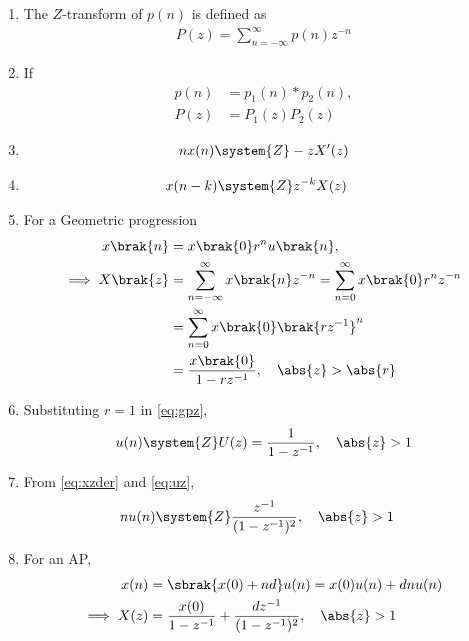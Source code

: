 \begin{enumerate}[label=\thechapter.\arabic*,ref=\thechapter.\theenumi]
\item 
	The $Z$-transform of $p(n)$ is defined as
\begin{align}
P(z) = \sum_{n=-\infty}^{\infty}p(n)z^{-n}
\label{eq:ztrans}
\end{align}
\item If 
\begin{align}
	p(n) &= p_1(n)* p_2(n),
	\\
	P(z)&=P_1(z)P_2(z)
\label{eq:prodz}
\end{align}
\item 
\begin{align}
	nx(n) \system{Z} -zX^{\prime}(z)
\label{eq:xzder}
\end{align}
\item 
\begin{align}
	x(n-k) &\system{Z} z^{-k}X(z)
\label{eq:shiftk}
\end{align}
\item For a Geometric progression 
\begin{align}
	       \label{eq:gpn}
	x\brak{n} &=x\brak{0}r^nu\brak{n},
	\\
         \implies      X\brak{z} &= \sum_{n=-\infty}^{\infty}x\brak{n}z^{-n}
               =\sum_{n=0}^{\infty}x\brak{0}r^nz^{-n}\\
                &=\sum_{n=0}^{\infty}x\brak{0}\brak{rz^{-1}}^n\\
               &= \frac{x\brak{0}}{1-rz^{-1}}, \quad \abs{z}>\abs{r} 
	       \label{eq:gpz}
\end{align}
\item 	       Substituting $r = 1$ in \eqref{eq:gpz},
\begin{align}
	u(n) \system{Z}	U(z) = 
                \frac{1}{1-z^{-1}}, \quad \abs{z}>1
	       \label{eq:uz}
\end{align}
\item From 
\eqref{eq:xzder}
	       and 
	       \eqref{eq:uz},
\begin{align}
nu(n) &\system{Z}\frac{z^{-1}}{(1-z^{-1})^{2}}, \quad \abs{z} > 1 
	       \label{eq:uzder}
\end{align}
\item For an AP, 
\begin{align}
	x(n) &= \sbrak{x(0) + nd} u(n) = x(0)u(n) + dnu(n)  \\
	\implies X(z) &= \frac{x(0)}{1-z^{-1}} + \frac{dz^{-1}}{(1-z^{-1})^{2}}, \quad \abs{z} > 1 

\end{align}
\end{enumerate}
